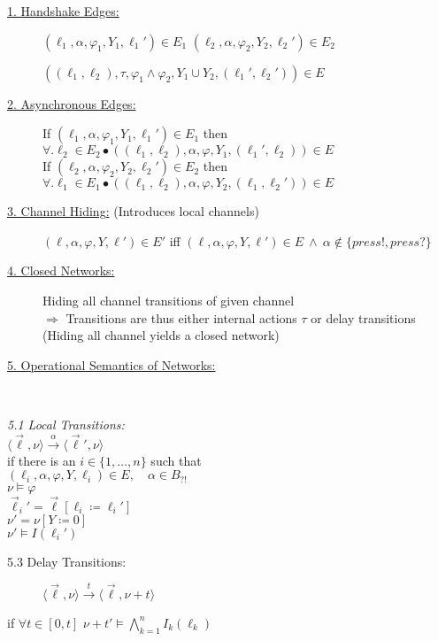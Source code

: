 \begin{tcolorbox}[colback=kapiteleins!5!white, colframe=orange!75!black, title=\textbf{Networks of Timed Automata}, left=0mm, right=0mm, top=0mm, bottom=0mm]
\begin{description}
\item[\uline{1. Handshake Edges:}] $(\ell_1, \alpha, \varphi_1, Y_1, \ell_1') \in E_1$ \hfill $(\ell_2, \alpha, \varphi_2, Y_2, \ell_2') \in E_2$
\vspace{-0.2cm}
\begin{center}
$\left( (\ell_1, \ell_2), \tau, \varphi_1 \land \varphi_2, Y_1 \cup Y_2, (\ell_1', \ell_2') \right) \in E$
\end{center}\vspace{-0.4cm}
\item[\uline{2. Asynchronous Edges:}] \hfill \newline
If $(\ell_1, \alpha, \varphi_1, Y_1, \ell_1') \in E_1$ then $\forall. \ell_2 \in E_2 \bullet \left( (\ell_1, \ell_2), \alpha, \varphi, Y_1, (\ell_1', \ell_2) \right) \in E$\\
If $(\ell_2, \alpha, \varphi_2, Y_2, \ell_2') \in E_2$ then $\forall. \ell_1 \in E_1 \bullet \left( (\ell_1, \ell_2), \alpha, \varphi, Y_2, (\ell_1, \ell_2') \right) \in E$

\item[\uline{3. Channel Hiding:} (Introduces local channels)] \hfill \newline
$(\ell, \alpha, \varphi, Y, \ell') \in E'$ \hfill iff $(\ell, \alpha, \varphi, Y, \ell') \in E ~ \land ~ \alpha \notin \{press!, press?\}$

\item[\uline{4. Closed Networks:}] Hiding all channel transitions of given channel\\
$\Rightarrow$ Transitions are thus either internal actions $\tau$ or delay transitions\,(Hiding all channel yields a closed network)
\item[\uline{5. Operational Semantics of Networks:}]\hfill \\[-0.25cm]
\end{description}
\begin{minipage}[t]{0.5\textwidth}
\emph{5.1 Local Transitions:}\\
$\langle \vec{\ell}, \nu \rangle \xrightarrow{\alpha} \langle \vec{\ell}', \nu \rangle$\\
if there is an $i \in \{1, \ldots, n\}$ such that\\
$\left( \ell_i, \alpha, \varphi, Y, \ell_i \right) \in E, \quad \alpha \in B_{?!}$\\
$\nu \models \varphi$\\
$\vec{\ell}_i ' = \vec{\ell} \left[ \ell_i \coloneqq \ell_i ' \right]$\\
$\nu' = \nu \left[ Y \coloneqq 0 \right]$\\
$\nu' \models I(\ell_i')$
\begin{description}
\item[5.3 Delay Transitions:] $\langle \vec{\ell}, \nu \rangle \xrightarrow{t} \langle \vec{\ell}, \nu + t\rangle$
\end{description}
if $\forall t \in [0, t]$ \qquad $\nu + t' \models \bigwedge_{k=1}^n I_k(\ell_k)$


\end{minipage}
\end{tcolorbox}
